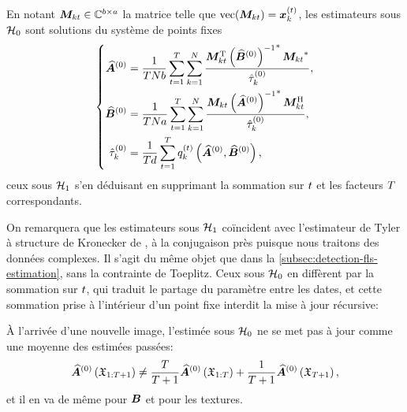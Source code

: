 \begin{proposition}
\label{prop:detection-online-mle}
  En notant $\boldsymbol{M}_{kt}\in\mathbb{C}^{b\times a}$ la matrice telle que $\operatorname{vec}(\boldsymbol{M}_{kt})=\boldsymbol{x}_k^{(t)}$, les estimateurs sous $\mathcal{H}_0$ sont solutions du système de points fixes
  \begin{equation}
    \left\{
    \begin{aligned}
      \widehat{\boldsymbol{A}}^{(0)} &= \frac{1}{TNb}
        \sum_{t=1}^{T}\sum_{k=1}^{N}
        \frac{\boldsymbol{M}_{kt}^{\mathrm{T}}\,{\left(\widehat{\boldsymbol{B}}^{(0)}\right)^{-1}}^{*}\,{\boldsymbol{M}_{kt}}^{*}}{\hat{\tau}_k^{(0)}},
      \\
      \widehat{\boldsymbol{B}}^{(0)} &= \frac{1}{TNa}
        \sum_{t=1}^{T}\sum_{k=1}^{N}
        \frac{\boldsymbol{M}_{kt}\,{\left(\widehat{\boldsymbol{A}}^{(0)}\right)^{-1}}^{*}\,\boldsymbol{M}_{kt}^{\mathrm{H}}}{\hat{\tau}_k^{(0)}},
      \\
      \hat{\tau}_k^{(0)} &= \frac{1}{Td}\sum_{t=1}^{T}
        q_k^{(t)}\left(\widehat{\boldsymbol{A}}^{(0)},\widehat{\boldsymbol{B}}^{(0)}\right),
    \end{aligned}
    \right.
    \label{eq:detection-online-mle}
  \end{equation}
  ceux sous $\mathcal{H}_1$ s'en déduisant en supprimant la sommation sur $t$ et les facteurs $T$ correspondants.
\end{proposition}

On remarquera que les estimateurs sous $\mathcal{H}_1$ coïncident avec l'estimateur de Tyler à structure de Kronecker de , à la conjugaison près puisque nous traitons des données complexes. Il s'agit du même objet que dans la \cref{subsec:detection-fls-estimation}, sans la contrainte de Toeplitz. Ceux sous $\mathcal{H}_0$ en diffèrent par la sommation sur $t$, qui traduit le partage du paramètre entre les dates, et cette sommation prise à l'intérieur d'un point fixe interdit la mise à jour récursive:

\begin{property}
\label{prop:detection-online-nonrecursif}
  À l'arrivée d'une nouvelle image, l'estimée sous $\mathcal{H}_0$ ne se met pas à jour comme une moyenne des estimées passées:
  \begin{equation}
    \widehat{\boldsymbol{A}}^{(0)}\left(\mathfrak{X}_{1:T+1}\right)
    \neq
    \frac{T}{T+1}\widehat{\boldsymbol{A}}^{(0)}\left(\mathfrak{X}_{1:T}\right)
    + \frac{1}{T+1}\widehat{\boldsymbol{A}}^{(0)}\left(\mathfrak{X}_{T+1}\right),
    \label{eq:detection-online-nonrecursif}
  \end{equation}
  et il en va de même pour $\boldsymbol{B}$ et pour les textures.
\end{property}

